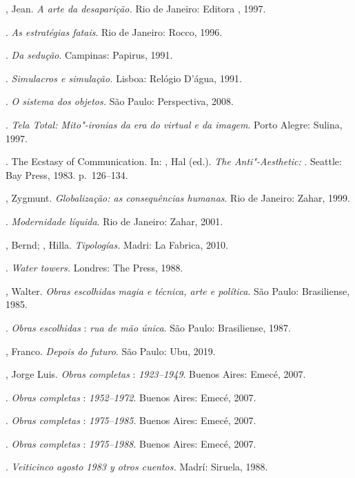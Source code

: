 \begin{bibliohedra}
, Jean. \emph{A arte da desaparição.} Rio de Janeiro:
Editora , 1997.

\tit{\_\_\_\_\_\_}. \emph{As estratégias fatais}. Rio de Janeiro: Rocco, 1996.

\tit{\_\_\_\_\_\_}. \emph{Da sedução}. Campinas: Papirus, 1991. 

\tit{\_\_\_\_\_\_}. \emph{Simulacros e simulação.} Lisboa: Relógio D'água, 1991.

\tit{\_\_\_\_\_\_}. \emph{O sistema dos objetos.} São Paulo: Perspectiva, 2008.

\tit{\_\_\_\_\_\_}. \emph{Tela Total: Mito"-ironias da era do virtual e da imagem}. Porto Alegre: Sulina, 1997.

\tit{\_\_\_\_\_\_}. The Ecstasy of Communication. In: , Hal (ed.). \emph{The Anti"-Aesthetic: }. Seattle: Bay Press, 1983. p.~126--134.

, Zygmunt. \emph{Globalização: as consequências humanas}. Rio de
Janeiro: Zahar, 1999.

\tit{\_\_\_\_\_\_}. \emph{Modernidade líquida}. Rio de Janeiro: Zahar, 2001.

, Bernd; , Hilla. \emph{Tipologías.} Madri: La Fabrica,
2010.

\tit{\_\_\_\_\_\_}. \emph{Water towers.} Londres: The  Press, 1988.

, Walter. \emph{Obras escolhidas}  \emph{magia e técnica, arte e
política}. São Paulo: Brasiliense, 1985.

\tit{\_\_\_\_\_\_}. \emph{Obras escolhidas} : \emph{rua de mão única}. São
Paulo: Brasiliense, 1987.

, Franco. \emph{Depois do futuro}. São Paulo: Ubu, 2019.

, Jorge Luis. \emph{Obras completas} : \emph{1923--1949}. Buenos Aires:
Emecé, 2007.

\tit{\_\_\_\_\_\_}. \emph{Obras completas} : \emph{1952--1972}. Buenos Aires:
Emecé, 2007.

\tit{\_\_\_\_\_\_}. \emph{Obras completas} : \emph{1975--1985}. Buenos Aires:
Emecé, 2007.

\tit{\_\_\_\_\_\_}. \emph{Obras completas} : \emph{1975--1988}. Buenos Aires:
Emecé, 2007.

\tit{\_\_\_\_\_\_}. \emph{Veiticinco agosto 1983 y otros cuentos.}
Madrí: Siruela, 1988.


\end{bibliohedra}
